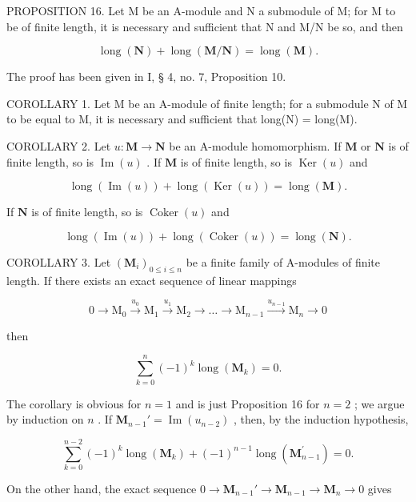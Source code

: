 PROPOSITION 16. Let M be an A-module and N a submodule of M; for M to be of finite length, it is necessary and sufficient that N and M/N be so, and then

\[
\operatorname{long} (\mathbf {N}) + \operatorname{long} (\mathbf {M} / \mathbf {N}) = \operatorname{long} (\mathbf {M}).\tag{34}
\]

The proof has been given in I, § 4, no. 7, Proposition 10.

COROLLARY 1. Let M be an A-module of finite length; for a submodule N of M to be equal to M, it is necessary and sufficient that long(N) = long(M).

COROLLARY 2. Let \(u: \mathbf{M} \to \mathbf{N}\) be an A-module homomorphism. If \(\mathbf{M}\) or \(\mathbf{N}\) is of finite length, so is \(\operatorname{Im}(u)\) . If \(\mathbf{M}\) is of finite length, so is \(\operatorname{Ker}(u)\) and

\[
\operatorname{long} (\operatorname{Im} (u)) + \operatorname{long} (\operatorname{Ker} (u)) = \operatorname{long} (\mathbf {M}).\tag{35}
\]

If \(\mathbf{N}\) is of finite length, so is \(\operatorname{Coker}(u)\) and

\[
\operatorname{long} (\operatorname{Im} (u)) + \operatorname{long} (\operatorname{Coker} (u)) = \operatorname{long} (\mathbf {N}).\tag{36}
\]

COROLLARY 3. Let \((\mathbf{M}_i)_{0\leqslant i\leqslant n}\) be a finite family of A-modules of finite length. If there exists an exact sequence of linear mappings

\[
0 \longrightarrow \mathrm{M} _ {0} \stackrel {u _ {0}} {\longrightarrow} \mathrm{M} _ {1} \stackrel {u _ {1}} {\longrightarrow} \mathrm{M} _ {2} \longrightarrow \dots \longrightarrow \mathrm{M} _ {n - 1} \stackrel {u _ {n - 1}} {\longrightarrow} \mathrm{M} _ {n} \longrightarrow 0\tag{37}
\]

then

\[
\sum_ {k = 0} ^ {n} (- 1) ^ {k} \operatorname{long} (\mathbf {M} _ {k}) = 0.\tag{38}
\]

The corollary is obvious for \(n = 1\) and is just Proposition 16 for \(n = 2\) ; we argue by induction on \(n\) . If \(\mathbf{M}_{n-1}' = \operatorname{Im}(u_{n-2})\) , then, by the induction hypothesis,

\[
\sum_ {k = 0} ^ {n - 2} (- 1) ^ {k} \operatorname{long} (\mathbf {M} _ {k}) + (- 1) ^ {n - 1} \operatorname{long} (\mathbf {M} _ {n - 1} ^ {\prime}) = 0.
\]

On the other hand, the exact sequence \(0 \to \mathbf{M}_{n-1}' \to \mathbf{M}_{n-1} \to \mathbf{M}_n \to 0\) gives

